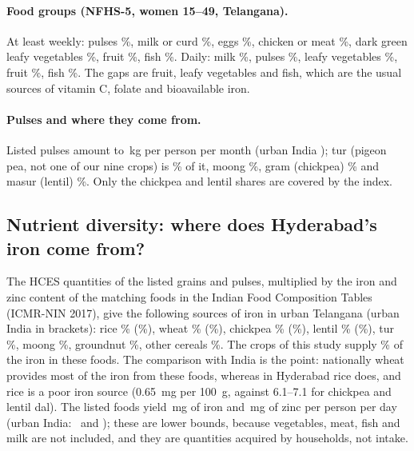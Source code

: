 \paragraph{Food groups (NFHS-5, women 15--49, Telangana).} At least weekly: pulses \hqWeeklyPulses\%, milk or curd
\hqWeeklyMilk\%, eggs \hqWeeklyEgg\%, chicken or meat \hqWeeklyMeat\%, dark green leafy vegetables
\hqWeeklyLeafy\%, fruit \hqWeeklyFruit\%, fish \hqWeeklyFish\%. Daily: milk \hqDailyMilk\%, pulses \hqDailyPulses\%,
leafy vegetables \hqDailyLeafy\%, fruit \hqDailyFruit\%, fish \hqDailyFish\%. The gaps are fruit, leafy
vegetables and fish, which are the usual sources of vitamin C, folate and bioavailable iron.

\paragraph{Pulses and where they come from.} Listed pulses amount to \hqTgUrbanKgPulses\,kg per person per
month (urban India \hqInUrbanKgPulses); tur (pigeon pea, not one of our nine crops) is \hqTgUrbanShareTur\% of it,
moong \hqTgUrbanShareMoong\%, gram (chickpea) \hqTgUrbanShareChick\% and masur (lentil) \hqTgUrbanShareLentil\%.
Only the chickpea and lentil shares are covered by the index.

\subsection{Nutrient diversity: where does Hyderabad's iron come from?}
The HCES quantities of the listed grains and pulses, multiplied by the iron and zinc content of the matching
foods in the Indian Food Composition Tables (ICMR-NIN 2017), give the following sources of iron in urban Telangana
(urban India in brackets): rice \hqTgUrbanFeRice\% (\hqInUrbanFeRice\%), wheat \hqTgUrbanFeWheat\%
(\hqInUrbanFeWheat\%), chickpea \hqTgUrbanFeChickpea\% (\hqInUrbanFeChickpea\%), lentil \hqTgUrbanFeLentil\%
(\hqInUrbanFeLentil\%), tur \hqTgUrbanFeTur\%, moong \hqTgUrbanFeMoong\%, groundnut \hqTgUrbanFeGroundnut\%, other
cereals \hqTgUrbanFeOtherCereal\%. The crops of this study supply \hqTgUrbanFeStudy\% of the iron in these foods.
The comparison with India is the point: nationally wheat provides most of the iron from these foods, whereas in
Hyderabad rice does, and rice is a poor iron source (\SI{0.65}{mg} per \SI{100}{g}, against 6.1--7.1 for
chickpea and lentil dal). The listed foods yield \hqTgUrbanFeListed\,mg of iron and \hqTgUrbanZnListed\,mg of zinc
per person per day (urban India: \hqInUrbanFeListed\ and \hqInUrbanZnListed); these are lower bounds, because
vegetables, meat, fish and milk are not included, and they are quantities acquired by households, not intake.

